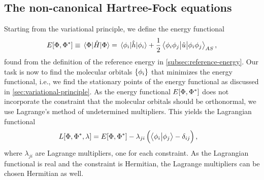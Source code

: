         \subsection{The non-canonical Hartree-Fock equations}
            Starting from the variational principle, we define the energy
            functional
            \begin{align}
                E[\Phi, \Phi^{*}]
                \equiv \mel{\Phi}{\hat{H}}{\Phi}
                =
                \mel{\phi_i}{\hat{h}}{\phi_i}
                + \frac{1}{2}\mel{\phi_i\phi_j}{\hat{u}}{\phi_i\phi_j}_{AS},
                \label{eq:energy_func_hf}
            \end{align}
            found from the definition of the reference energy in
            \autoref{subsec:reference-energy}.
            Our task is now to find the molecular orbitals $\left\{ \phi_i \right\}$ that
            minimizes the energy functional, i.e., we find the stationary points
            of the energy functional as discussed in
            \autoref{sec:variational-principle}.
            As the energy functional $E[\Phi, \Phi^{*}]$ does not
            incorporate the constraint that the molecular orbitals should be
            orthonormal, we use Lagrange's method of undetermined multipliers.
            This yields the Lagrangian functional
            \begin{align}
                L[\Phi, \Phi^{*}, \lambda]
                &= E[\Phi, \Phi^{*}]
                - \lambda_{ji}\left( 
                    \braket{\phi_i}{\phi_j}
                    - \delta_{ij}
                 \right),
            \end{align}
            where $\lambda_{ji}$ are Lagrange multipliers, one for each
            constraint.
            As the Lagrangian functional is real and the constraint is
            Hermitian, the Lagrange multipliers can be chosen Hermitian as well.

